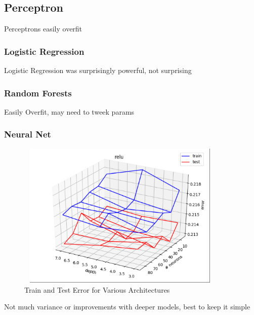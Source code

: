 \subsection{Perceptron}
Perceptrons easily overfit

\subsubsection{Logistic Regression}
Logistic Regression was surprisingly powerful, not surprising


\subsubsection{Random Forests}
Easily Overfit, may need to tweek params

\subsubsection{Neural Net}

\begin{figure}[h!]
	\centering
	\includegraphics[width=10cm, height=7cm]{neural_nets.png}
	\caption{Train and Test Error for Various Architectures}
	\label{fig:neural_net}
\end{figure}

Not much variance or improvements with deeper models, best to keep it simple
